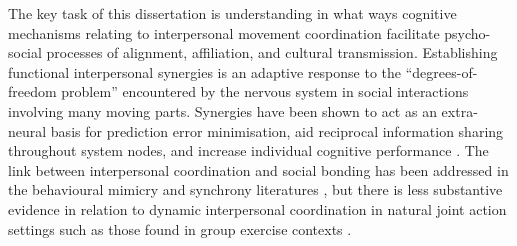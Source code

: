 \begin{CJK}{UTF8}{gbsn}
The key task of this dissertation is understanding in what ways cognitive mechanisms relating to interpersonal movement coordination facilitate psycho-social processes of alignment, affiliation, and cultural transmission\citep{Marsh2009}.  Establishing functional interpersonal synergies is an adaptive response to the ``degrees-of-freedom problem'' encountered by the nervous system in social interactions involving many moving parts.  Synergies have been shown to act as an extra-neural basis for prediction error minimisation, aid reciprocal information sharing throughout system nodes, and increase individual cognitive performance \citep{Schmidt2016}.  The link between interpersonal coordination and social bonding has been addressed in the behavioural mimicry and synchrony literatures \citep[e.g.,][]{Wheatley2012,Launay2016,Mogan2017}, but there is less substantive evidence in relation to dynamic interpersonal coordination in natural joint action settings such as those found in group exercise contexts \citep{Marsh2009,Miles2009,Lumsden2012}.


\end{CJK}
